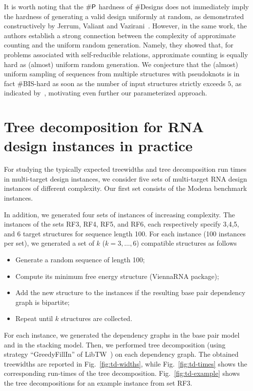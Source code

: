 \documentclass[10pt]{article}
\newcommand{\NumDesign}{\ensuremath{\#}{\sf Designs}\xspace}
\newcommand{\citep}[1]{\cite{#1}}
\newcommand{\citet}[1]{\cite{#1}}
\begin{document}
It is worth noting that the $\#{\sf P}$ hardness of \NumDesign does not immediately imply the hardness of generating a valid design uniformly at random, as demonstrated constructively by Jerrum, Valiant and Vazirani~\citep{Jerrum1986}. However, in the same work, the authors establish a strong connection between the complexity of approximate counting and the uniform random generation. Namely, they showed that, for problems associated with self-reducible relations, approximate counting is equally hard as (almost) uniform random generation. We conjecture that the (almost) uniform sampling of sequences from multiple structures with pseudoknots is in fact \#{\sf BIS}-hard as soon as the number of input structures strictly exceeds $5$, as indicated by~\citet{Goldberg2004}, motivating even further our parameterized approach.

\section{Tree decomposition for RNA design instances in practice}
\label{appsec:treedecomp}

For studying the typically expected treewidths and tree decomposition
run times in multi-target design instances, we consider five sets of
multi-target RNA design instances of different complexity. Our first
set consists of the Modena benchmark instances.

In addition, we generated four sets of instances of increasing
complexity. The instances of the sets RF3, RF4, RF5, and RF6, each
respectively specify 3,4,5, and 6 target structures for sequence
length 100.  For each instance (100 instances per set), we generated a
set of $k$ ($k=3,\dots,6$) compatible structures as follows
\begin{itemize}
\item Generate a random sequence of length 100;
\item Compute its minimum free energy structure (ViennaRNA package);
\item Add the new structure to the instances if the resulting base pair dependency graph is bipartite;
\item Repeat until $k$ structures are collected.
\end{itemize}
For each instance, we generated the dependency graphs in the base pair
model and in the stacking model. Then, we performed tree decomposition
(using strategy ``GreedyFillIn'' of LibTW~\citep{Dijk2006}) on each dependency
graph. The obtained treewidths are reported in
Fig.~\ref{fig:td-widths}, while Fig.~\ref{fig:td-times} shows the
corresponding run-times of the tree decomposition.
Fig.~\ref{fig:td-example} shows the tree decompositions for an example
instance from set RF3.
\end{document}
